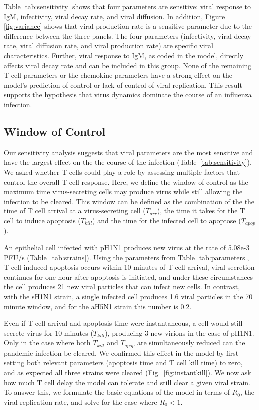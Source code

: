 \documentclass[10pt]{article}
\begin{document}
Table \ref{tab:sensitivity} shows that four parameters are sensitive: viral response to IgM, infectivity, viral decay rate, and viral diffusion.  In addition, Figure \ref{fig:variance} shows that viral production rate is a sensitive parameter due to the difference between the three panels.  The four parameters (infectivity, viral decay rate, viral diffusion rate, and viral production rate) are specific viral characteristics.  Further, viral response to IgM, as coded in the model, directly affects viral decay rate and can be included in this group.  None of the remaining T cell parameters or the chemokine parameters have a strong effect on the model's prediction of control or lack of control of viral replication.  This result supports the hypothesis that virus dynamics dominate the course of an influenza infection.  


\subsection*{Window of Control}

Our sensitivity analysis suggests that viral parameters are the most sensitive and have the largest effect on the the course of the infection (Table~\ref{tab:sensitivity}).  We asked whether T cells could play a role by assessing multiple factors that control the overall T cell response.  Here, we define the window of control as the maximum time virus-secreting cells may produce virus while still allowing the infection to be cleared.  This window can be defined as the combination of the the time of T cell arrival at a virus-secreting cell ($T_{arr}$), the time it takes for the T cell to induce apoptosis ($T_{kill}$) and the time for the infected cell to apoptose ($T_{apop}$).

An epithelial cell infected with pH1N1 produces new virus at the rate of 5.08e-3 PFU/s (Table~\ref{tab:strains}).  Using the parameters from Table \ref{tab:parameters}, T cell-induced apoptosis occurs within 10 minutes of T cell arrival, viral secretion continues for one hour after apoptosis is initiated, and under these circumstances the cell produces 21 new viral particles that can infect new cells.  In contrast, with the sH1N1 strain, a single infected cell produces 1.6 viral particles in the 70 minute window, and for the aH5N1 strain this number is 0.2.  %

Even if T cell arrival and apoptosis time were instantaneous, a cell would still secrete virus for 10 minutes ($T_{kill}$), producing 3 new virions in the case of pH1N1.  Only in the case where both $T_{kill}$ and $T_{apop}$ are simultaneously reduced can the pandemic infection be cleared.  We confirmed this effect in the model by first setting both relevant parameters (apoptosis time and T cell kill time) to zero, and as expected all three strains were cleared (Fig.~\ref{fig:instantkill}).  We now ask how much T cell delay the model can tolerate and still clear a given viral strain.  To answer this, we formulate the basic equations of the model in terms of $R_0$, the viral replication rate, and solve for the case where $R_0 < 1$.
\end{document}
